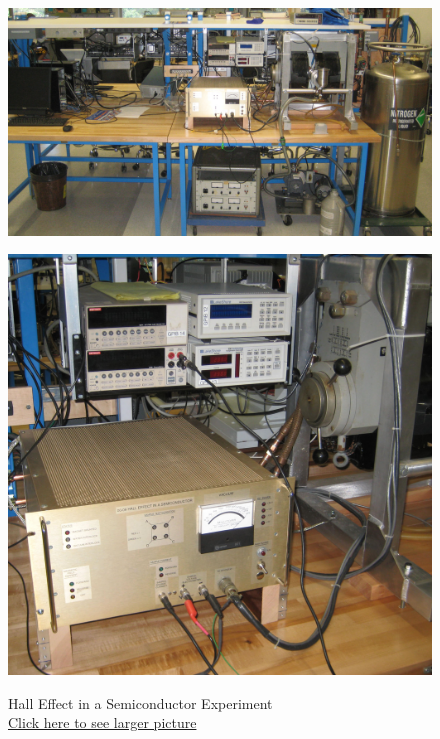 \documentclass{../lab}
\begin{document}
\noindent
\begin{figure}[H]
\captionsetup{justification=centering}
  \href{http://experimentationlab.berkeley.edu/sites/default/files/images/SHE_3541_Crop.jpg}{\includegraphics[width=\linewidth,keepaspectratio]{images/SHE_3541_Crop.jpg}}
  \caption{Hall Effect in a Semiconductor Experiment \\ \href{http://experimentationlab.berkeley.edu/sites/default/files/images/SHE_3541_Crop.jpg}{Click here to see larger picture}}
  \label{fig:SHE_3541_Crop.jpg}
\endminipage\hfill
{}
  \href{http://experimentationlab.berkeley.edu/sites/default/files/images/SHE_Electronics_3546_Crop.jpg}{\includegraphics[width=\linewidth,keepaspectratio]{images/SHE_Electronics_3546_Crop.jpg}}

\end{figure}
\end{document}

